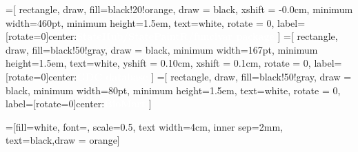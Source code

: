 =[
	rectangle,
	draw,
    fill=black!20!orange,
    draw = black,
    xshift = -0.0cm,
    minimum width=460pt,
    minimum height=1.5em,
    text=white,
    rotate = 0,
    label={[rotate=0]center:\textcolor{white}{\textbf{StateHub/StatePaintR/funcivar package}}}
]
=[
	rectangle,
	draw,
    fill=black!50!gray,
    draw = black,
    minimum width=167pt,
    minimum height=1.5em,
    text=white,
    yshift = 0.10cm,
    xshift = 0.1cm,
    rotate = 0,
    label={[rotate=0]center:\textcolor{white}{\textbf{GDC database}}}
]
=[
	rectangle,
	draw,
    fill=black!50!gray,
    draw = black,
    minimum width=80pt,
    minimum height=1.5em,
    text=white,
    rotate = 0,
    label={[rotate=0]center:\textcolor{white}{\textbf{BioMart}}}
]

=[fill=white, font=\sf \small, scale=0.5, text width=4cm, inner sep=2mm, text=black,draw = orange]



